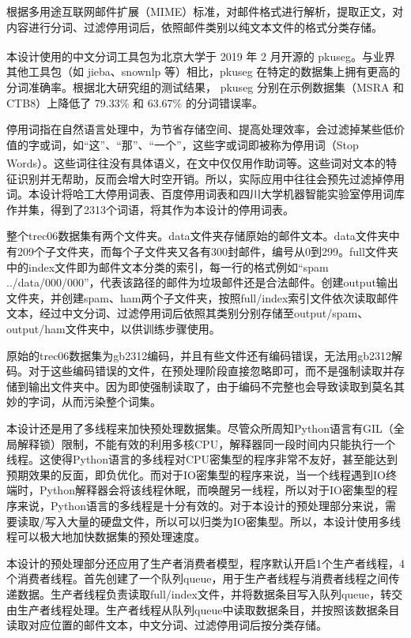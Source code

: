 \documentclass[UTF8,zihao=-4]{ctexart}
\newcommand{\upcite}[1]{\textsuperscript{\cite{#1}}}
\begin{document}
	根据多用途互联网邮件扩展（MIME）标准，对邮件格式进行解析，提取正文，对内容进行分词、过滤停用词后，依照邮件类别以纯文本文件的格式分类存储。
		
	本设计使用的中文分词工具包为北京大学于 2019 年 2 月开源的 pkuseg\upcite{pkuseg}。与业界其他工具包（如 jieba、snownlp 等）相比，pkuseg 在特定的数据集上拥有更高的分词准确率。根据北大研究组的测试结果， pkuseg 分别在示例数据集（MSRA 和 CTB8）上降低了 79.33\% 和 63.67\% 的分词错误率\cite{pkuseg}。
	
	停用词指在自然语言处理中，为节省存储空间、提高处理效率，会过滤掉某些低价值的字或词，如“这”、“那”、“一个”，这些字或词即被称为停用词（Stop Words）\upcite{stopwords}。这些词往往没有具体语义，在文中仅仅用作助词等。这些词对文本的特征识别并无帮助，反而会增大时空开销。所以，实际应用中往往会预先过滤掉停用词。本设计将哈工大停用词表、百度停用词表和四川大学机器智能实验室停用词库作并集，得到了2313个词语，将其作为本设计的停用词表。
	
	整个trec06数据集有两个文件夹。data文件夹存储原始的邮件文本。data文件夹中有209个子文件夹，而每个子文件夹又各有300封邮件，编号从0到299。full文件夹中的index文件即为邮件文本分类的索引，每一行的格式例如“spam ../data/000/000”，代表该路径的邮件为垃圾邮件还是合法邮件。创建output输出文件夹，并创建spam、ham两个子文件夹，按照full/index索引文件依次读取邮件文本，经过中文分词、过滤停用词后依照其类别分别存储至output/spam、output/ham文件夹中，以供训练步骤使用。
	
	原始的trec06数据集为gb2312编码，并且有些文件还有编码错误，无法用gb2312解码。对于这些编码错误的文件，在预处理阶段直接忽略即可，而不是强制读取并存储到输出文件夹中。因为即使强制读取了，由于编码不完整也会导致读取到莫名其妙的字词，从而污染整个词集。
	
	本设计还是用了多线程来加快预处理数据集。尽管众所周知Python语言有GIL（全局解释锁）限制，不能有效的利用多核CPU，解释器同一段时间内只能执行一个线程。这使得Python语言的多线程对CPU密集型的程序非常不友好，甚至能达到预期效果的反面，即负优化。而对于IO密集型的程序来说，当一个线程遇到IO终端时，Python解释器会将该线程休眠，而唤醒另一线程，所以对于IO密集型的程序来说，Python语言的多线程是十分有效的。对于本设计的预处理部分来说，需要读取/写入大量的硬盘文件，所以可以归类为IO密集型。所以，本设计使用多线程可以极大地加快数据集的预处理速度。
	
	本设计的预处理部分还应用了生产者消费者模型，程序默认开启1个生产者线程，4个消费者线程。首先创建了一个队列queue，用于生产者线程与消费者线程之间传递数据。生产者线程负责读取full/index文件，并将数据条目写入队列queue，转交由生产者线程处理。生产者线程从队列queue中读取数据条目，并按照该数据条目读取对应位置的邮件文本，中文分词、过滤停用词后按分类存储。
\end{document}
